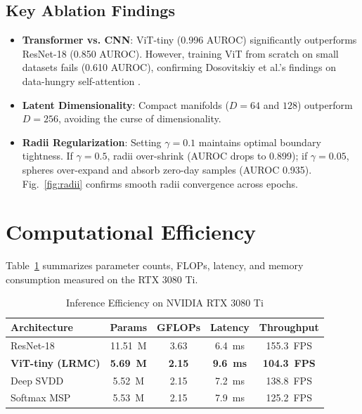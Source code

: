 \documentclass[conference]{IEEEtran}
\begin{document}
\subsection{Key Ablation Findings}
\begin{itemize}
    \item \textbf{Transformer vs. CNN}: ViT-tiny (0.996 AUROC) significantly outperforms ResNet-18 (0.850 AUROC). However, training ViT from scratch on small datasets fails (0.610 AUROC), confirming Dosovitskiy et al.'s findings on data-hungry self-attention \cite{dosovitskiy2020}.
    \item \textbf{Latent Dimensionality}: Compact manifolds ($D = 64$ and $128$) outperform $D = 256$, avoiding the curse of dimensionality.
    \item \textbf{Radii Regularization}: Setting $\gamma = 0.1$ maintains optimal boundary tightness. If $\gamma = 0.5$, radii over-shrink (AUROC drops to 0.899); if $\gamma = 0.05$, spheres over-expand and absorb zero-day samples (AUROC 0.935). Fig.~\ref{fig:radii} confirms smooth radii convergence across epochs.
\end{itemize}

\section{Computational Efficiency}

Table~\ref{tab:efficiency} summarizes parameter counts, FLOPs, latency, and memory consumption measured on the RTX 3080 Ti.

\begin{table}[t]
\centering
\caption{Inference Efficiency on NVIDIA RTX 3080 Ti}
\label{tab:efficiency}
\begin{tabular}{lcccc}
\toprule
Architecture & Params & GFLOPs & Latency & Throughput \\
\midrule
ResNet-18 & 11.51~M & 3.63 & 6.4~ms & 155.3~FPS \\
\textbf{ViT-tiny (LRMC)} & \textbf{5.69~M} & \textbf{2.15} & \textbf{9.6~ms} & \textbf{104.3~FPS} \\
Deep SVDD & 5.52~M & 2.15 & 7.2~ms & 138.8~FPS \\
Softmax MSP & 5.53~M & 2.15 & 7.9~ms & 125.2~FPS \\
\bottomrule
\end{tabular}
\end{table}
\end{document}
